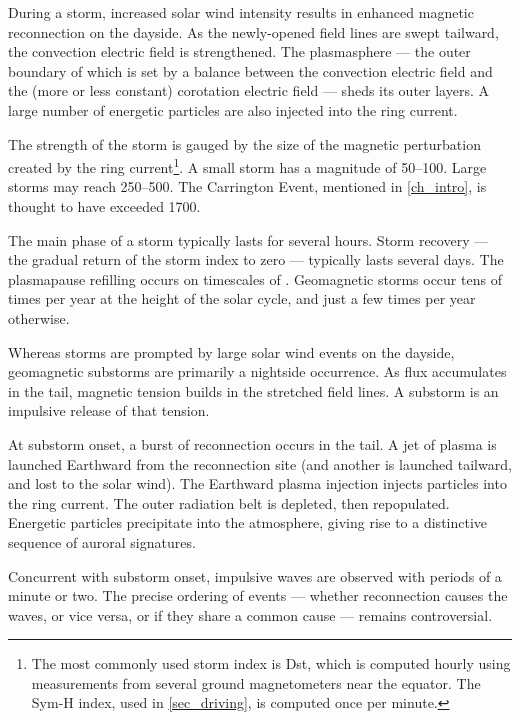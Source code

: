 During a storm, increased solar wind intensity results in enhanced magnetic reconnection on the dayside. As the newly-opened field lines are swept tailward, the convection electric field is strengthened. The plasmasphere --- the outer boundary of which is set by a balance between the convection electric field and the (more or less constant) corotation electric field --- sheds its outer layers. A large number of energetic particles are also injected into the ring current\cite{mcpherron_1997}. 

The strength of the storm is gauged by the size of the magnetic perturbation created by the ring current\footnote{The most commonly used storm index is Dst, which is computed hourly using measurements from several ground magnetometers near the equator. The Sym-H index, used in \cref{sec_driving}, is computed once per minute. }. A small storm has a magnitude of \SIrange{50}{100}{\nT}. Large storms may reach \SIrange{250}{500}{\nT}. The Carrington Event, mentioned in \cref{ch_intro}, is thought to have exceeded \SI{1700}{\nT}\cite{tsurutani_2003}. 

The main phase of a storm typically lasts for several hours. Storm recovery --- the gradual return of the storm index to zero --- typically lasts several days. The plasmapause refilling occurs on timescales of . Geomagnetic storms occur tens of times per year at the height of the solar cycle, and just a few times per year otherwise. 

Whereas storms are prompted by large solar wind events on the dayside, geomagnetic substorms are primarily a nightside occurrence. As flux accumulates in the tail, magnetic tension builds in the stretched field lines. A substorm is an impulsive release of that tension. 


At substorm onset, a burst of reconnection occurs in the tail. A jet of plasma is launched Earthward from the reconnection site (and another is launched tailward, and lost to the solar wind). The Earthward plasma injection injects particles into the ring current. The outer radiation belt is depleted, then repopulated. Energetic particles precipitate into the atmosphere, giving rise to a distinctive  sequence of auroral signatures. 

Concurrent with substorm onset, impulsive \Alfven waves are observed with periods of a minute or two. The precise ordering of events --- whether reconnection causes the waves, or vice versa, or if they share a common cause --- remains controversial. 


